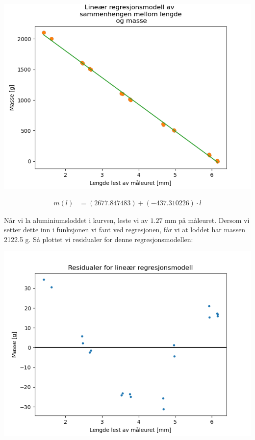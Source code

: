\begin{center}
\includegraphics[scale=0.7]{Figurer/Lab_2_regresjon.png}
\end{center}

\begin{align*}
    m(l) &= (2677.847483) + (-437.310226)\cdot l 
\end{align*}
\bigskip

Når vi la aluminiumsloddet i kurven, leste vi av $1.27$ mm på måleuret. Dersom vi setter dette inn i funksjonen vi fant ved regresjonen, får vi at loddet har massen 2122.5 g. Så plottet vi residualer for denne regresjonsmodellen:

\begin{center}
\includegraphics[scale=0.7]{Figurer/Lab_2_Residualer.png}
\end{center}

